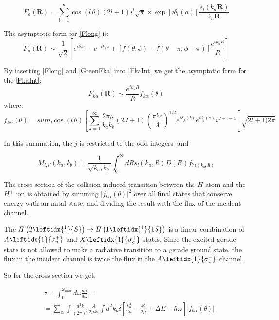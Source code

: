 \begin{equation}\label{Flong}
F_a(\mathbf{R}) = \sum_{l=1}^{\infty}{\cos(l\,\theta)(2l+1)i^{l}\sqrt{\pi}\times \exp[i\delta_l(a)]\frac{s_l(k_a\mathbf{R})}{k_a\mathbf{R} } } 
\end{equation}

The asymptotic form for \eqref{Flong} is:
\begin{equation}\label{FlongA}
F_a(\mathbf{R}) \sim \frac{1}{\sqrt{2}}\left[e^{ik_az}-e^{-ik_az} + [f(\theta,\phi) - f(\theta-\pi,\phi+\pi)]\frac{e^{ik_aR}}{R}\right]
\end{equation}

By inserting \eqref{Flong} and \eqref{GreenFka} into \eqref{FkaInt} we get the asymptotic form for the  \eqref{FkaInt}:
\begin{equation}\label{FlongAA}
F_{k\alpha}(\mathbf{R}) \sim \frac{e^{ik_aR}}{R}f_{k\alpha}(\theta)
\end{equation}
where:
\begin{equation}\label{fkaa}
f_{k\alpha}(\theta) = sum_{l}{\cos(l\,\theta)\left[\sum_{J=1}^{\infty}{\frac{2\pi\mu}{k_ak_b}(2J+1)\left(\frac{\pi k c}{A}\right)^{1/2}e^{i\delta_j(b)}e^{i\delta_j(a)}i^{J+l-1} }\right]\sqrt{2l+1)2\pi}}
\end{equation}

In this summation, the $ j $ is restricted to the odd integers, and 

\begin{equation}\label{Mll}
M_{l,l'}(k_a,k_b) = \frac{1}{\sqrt{k_a,k_b}}\int_0^{\infty}{dRs_l(k_a,R)D(R)f_{l')(k_b,R)} }
\end{equation}

The cross section of the collision induced transition between the $ H $ atom and the $ H^{+} $ ion is obtained by summing $ \left|f_{k\alpha}(\theta)\right|^2 $ over all final states that conserve energy with an inital state, and dividing the result with the flux of the incident channel.

The $ H\left(2 \leftidx{^1}{S}\right) \rightarrow H\left(1 \leftidx{^1}{1S}\right) $ is a linear combination of $ A \leftidx{1}{\sigma_u^{+}} $ and $ X \leftidx{1}{\sigma_g^{+}} $ states. Since the excited gerade state is not allowed to make a radiative transition to a gerade ground state, the flux in the incident channel is twice the flux in the $ A \leftidx{1}{\sigma_u^{+}} $ channel.

So for the cross section we get:

\begin{equation}\label{crs}
\begin{split}
& \sigma = \int_0^{\omega_{max}}{d\omega\frac{d\sigma}{d\omega}} = \\[.8em]
& = \sum_{\alpha}{\int{\frac{d^2k}{(2\pi)^2}\frac{A}{2\mu k_a}\int{d^2k_b\delta\left[\frac{k_b^2}{2\mu} - \frac{k_a^2}{2\mu} + \Delta E - \hbar\omega \right]\left|f_{k\alpha}(\theta) \right| } } }
\end{split}
\end{equation}

